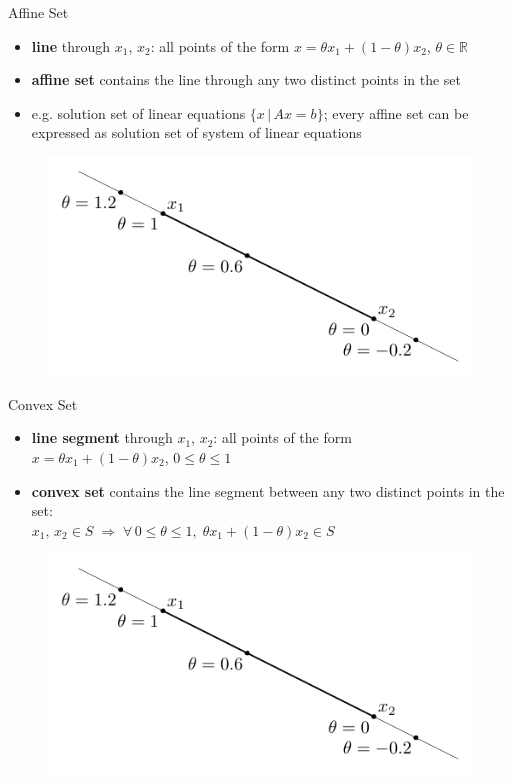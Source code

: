 \documentclass[10pt]{beamer}
\newcommand{\ds}{\displaystyle}
\newcommand{\ie}{\;\Longrightarrow\;}
\theoremstyle{definition}
\begin{document}
\begin{frame}{Affine Set}
  \begin{itemize}
    \item {\bf line} through $x_1$, $x_2$: all points of the form $\ds x = \theta x_1 + (1 - \theta) x_2$, $\theta\in\mathbb{R}$
    \item {\bf affine set} contains the line through any two distinct points in the set
    \item e.g. solution set of linear equations $\ds\{x\,|\,Ax = b\}$; every affine set can be expressed as solution set of system of linear equations
  \end{itemize}
  \begin{figure}[!htbp]
    \centering
    \includegraphics[scale=0.75,page=1]{fig/note06/02.pdf}
  \end{figure}
\end{frame}

\begin{frame}{Convex Set}
  \begin{itemize}
    \item {\bf line segment} through $x_1$, $x_2$: all points of the form \\$\ds x = \theta x_1 + (1 - \theta) x_2$, $0\leqslant\theta\leqslant 1$
    \item {\bf convex set} contains the line segment between any two distinct points in the set: \\$\ds x_1,\,x_2\in S\ie \forall\,0\leqslant\theta\leqslant 1,\;\theta x_1 + (1 - \theta) x_2\in S$
  \end{itemize}
  \begin{figure}[!htbp]
    \centering
    \includegraphics[scale=1,page=2]{fig/note06/02.pdf}
  \end{figure}
\end{frame}
\end{document}
